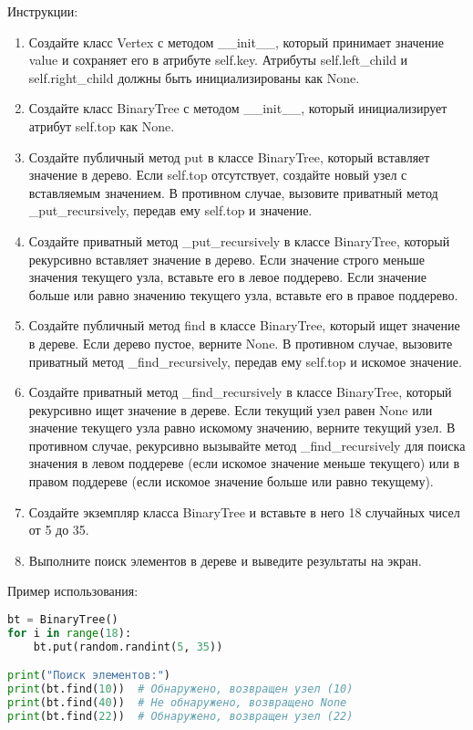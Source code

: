 \begin{enumerate}
Инструкции:
\begin{enumerate}
    \item Создайте класс Vertex с методом \_\_init\_\_, который принимает значение value и сохраняет его в атрибуте self.key. Атрибуты self.left\_child и self.right\_child должны быть инициализированы как None.
    \item Создайте класс BinaryTree с методом \_\_init\_\_, который инициализирует атрибут self.top как None.
    \item Создайте публичный метод put в классе BinaryTree, который вставляет значение в дерево. Если self.top отсутствует, создайте новый узел с вставляемым значением. В противном случае, вызовите приватный метод \_put\_recursively, передав ему self.top и значение.
    \item Создайте приватный метод \_put\_recursively в классе BinaryTree, который рекурсивно вставляет значение в дерево. Если значение строго меньше значения текущего узла, вставьте его в левое поддерево. Если значение больше или равно значению текущего узла, вставьте его в правое поддерево.
    \item Создайте публичный метод find в классе BinaryTree, который ищет значение в дереве. Если дерево пустое, верните None. В противном случае, вызовите приватный метод \_find\_recursively, передав ему self.top и искомое значение.
    \item Создайте приватный метод \_find\_recursively в классе BinaryTree, который рекурсивно ищет значение в дереве. Если текущий узел равен None или значение текущего узла равно искомому значению, верните текущий узел. В противном случае, рекурсивно вызывайте метод \_find\_recursively для поиска значения в левом поддереве (если искомое значение меньше текущего) или в правом поддереве (если искомое значение больше или равно текущему).
    \item Создайте экземпляр класса BinaryTree и вставьте в него 18 случайных чисел от 5 до 35.
    \item Выполните поиск элементов в дереве и выведите результаты на экран.
\end{enumerate}

Пример использования:
\begin{lstlisting}[language=Python]
bt = BinaryTree()
for i in range(18):
    bt.put(random.randint(5, 35))

print("Поиск элементов:")
print(bt.find(10))  # Обнаружено, возвращен узел (10)
print(bt.find(40))  # Не обнаружено, возвращено None
print(bt.find(22))  # Обнаружено, возвращен узел (22)
\end{lstlisting}


\end{enumerate}
